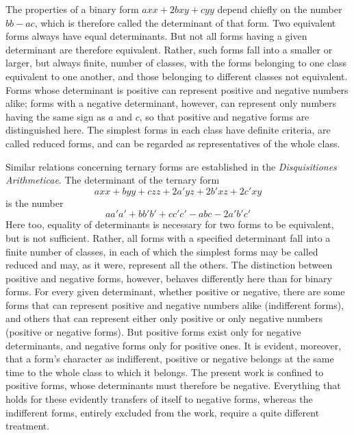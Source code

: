 The properties of a binary form $axx+2bxy+cyy$ depend chiefly on the number $bb-ac$, which is therefore called the determinant of that form. Two equivalent forms always have equal determinants. But not all forms having a given determinant are therefore equivalent. Rather, such forms fall into a smaller or larger, but always finite, number of classes, with the forms belonging to one class equivalent to one another, and those belonging to different classes not equivalent. Forms whose determinant is positive can represent positive and negative numbers alike; forms with a negative determinant, however, can represent only numbers having the same sign as $a$ and $c$, so that positive and negative forms are distinguished here. The simplest forms in each class have definite criteria, are called reduced forms, and can be regarded as representatives of the whole class.

Similar relations concerning ternary forms are established in the \emph{Disquisitiones Arithmeticae}. The determinant of the ternary form
\[
axx+byy+czz+2a'yz+2b'xz+2c'xy
\]
is the number
\[
aa'a'+bb'b'+cc'c'-abc-2a'b'c'
\]
Here too, equality of determinants is necessary for two forms to be equivalent, but is not sufficient. Rather, all forms with a specified determinant fall into a finite number of classes, in each of which the simplest forms may be called reduced and may, as it were, represent all the others. The distinction between positive and negative forms, however, behaves differently here than for binary forms. For every given determinant, whether positive or negative, there are some forms that can represent
positive and negative numbers alike (indifferent forms), and others that can represent either only positive or only negative numbers (positive or negative forms). But positive forms exist only for negative determinants, and negative forms only for positive ones. It is evident, moreover, that a form's character as indifferent, positive or negative belongs at the same time to the whole class to which it belongs. The present work is confined to positive forms, whose determinants must therefore be negative. Everything that holds for these evidently transfers of itself to negative forms, whereas the indifferent forms, entirely excluded from the work, require a quite different treatment.

